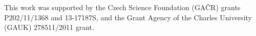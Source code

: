\documentclass{itatnew}
\begin{document}
This work was supported by the Czech Science Foundation (GA\v{C}R) grants \hbox{P202/11/1368} and \hbox{13-17187S}, and the Grant Agency of the Charles University (GAUK) \hbox{278511/2011} grant. 

%
%


% 
% 
% 
% 
% 
\end{document}
